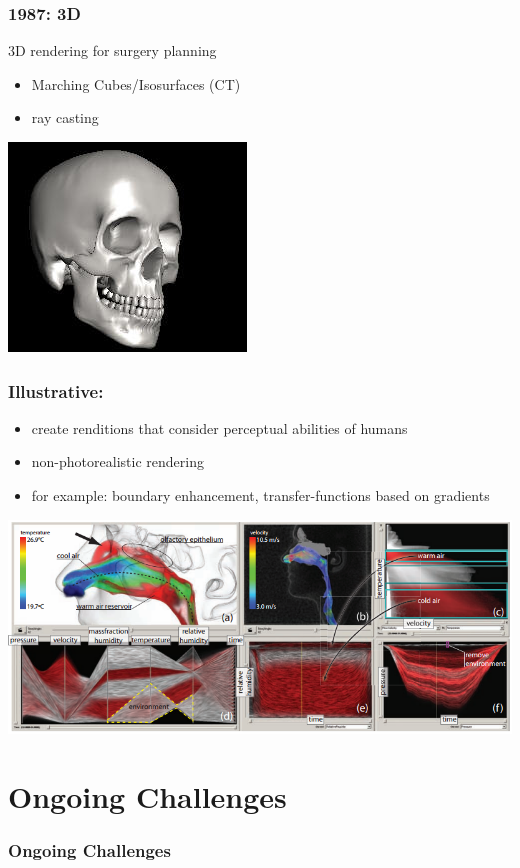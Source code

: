 \documentclass{beamer}
\begin{document}
\begin{frame}
	\frametitle{1987: 3D}
	3D rendering for surgery planning
	\begin{itemize}
		\item Marching Cubes/Isosurfaces (CT)
		\item ray casting
	\end{itemize}
	\begin{center}
		\includegraphics[width=.4\textwidth,height=.4\textheight]{images/marching}
	\end{center}
\end{frame}

\begin{frame}
	\frametitle{Illustrative:} %
	\begin{itemize}
		\item create renditions that consider perceptual abilities of humans
		\item non-photorealistic rendering
		\item for example: boundary enhancement, transfer-functions based on
gradients
	\end{itemize}
	\includegraphics[width=\textwidth]{images/nose}
\end{frame}

\section{Ongoing Challenges}

\begin{frame}
	\frametitle{Ongoing Challenges}
\end{frame}
\end{document}
